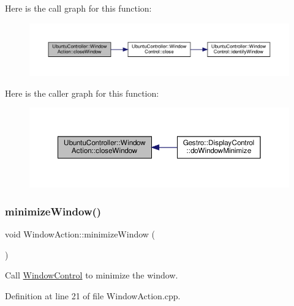 Here is the call graph for this function\+:
\nopagebreak
\begin{figure}[H]
\begin{center}
\leavevmode
\includegraphics[width=350pt]{class_ubuntu_controller_1_1_window_action_a99150ce49f2956c56e64b6ba0246424f_cgraph}
\end{center}
\end{figure}
Here is the caller graph for this function\+:
\nopagebreak
\begin{figure}[H]
\begin{center}
\leavevmode
\includegraphics[width=350pt]{class_ubuntu_controller_1_1_window_action_a99150ce49f2956c56e64b6ba0246424f_icgraph}
\end{center}
\end{figure}
\mbox{\label{class_ubuntu_controller_1_1_window_action_aa6f2b2543505c0c44027b501f151d4bf}} 
\subsubsection{\texorpdfstring{minimize\+Window()}{minimizeWindow()}}
{\footnotesize\ttfamily void Window\+Action\+::minimize\+Window (\begin{DoxyParamCaption}{ }\end{DoxyParamCaption})}

Call \hyperlink{class_ubuntu_controller_1_1_window_control}{Window\+Control} to minimize the window. 

Definition at line 21 of file Window\+Action.\+cpp.

